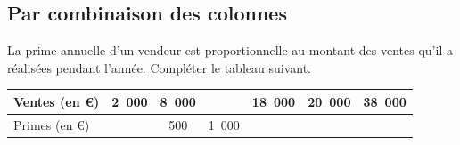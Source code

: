 \documentclass[a4paper]{book}
\begin{document}
\subsection{Par combinaison des colonnes}
    \begin{exemple}
        La prime annuelle d'un vendeur est proportionnelle au montant des ventes qu'il a réalisées pendant l'année. Compléter le tableau suivant.

        \vspace{2cm}

        \begin{center}
            \renewcommand{\arraystretch}{1.5}
            \begin{tabular}{|l|c|c|c|c|c|c|}
                \hline
                Ventes (en €) & 2~000 & 8~000 & & 18~000 & 20~000 & 38~000 \\ \hline
                Primes (en €) & & 500 & 1~000 & & & \\ \hline
            \end{tabular}
        \end{center}

        \vspace{2cm}
    \end{exemple}

    
\newpage
\end{document}
